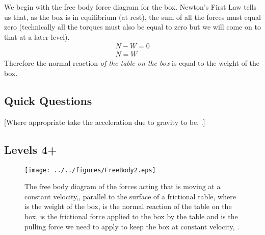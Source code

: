 \noindent We begin with the free body force diagram for the box.  Newton's First Law tells us that, as the box is in equilibrium (at rest), the sum of all the forces must equal zero (technically all the torques must also be equal to zero but we will come on to that at a later level).
\begin{eqnarray}
N-W=0 \\
N=W
\end{eqnarray}
Therefore the normal reaction \emph{of the table on the box} is equal to the weight of the box.

\subsection*{Quick Questions}
[Where appropriate take the acceleration due to gravity to be, .]\nll
{}\nl
{}\nl
{}


\subsection*{Levels 4+}
\setlength{\columnsep}{22pt}
\begin{wrapfigure}{r}{6cm} \vspace{-2.0cm}
\center
\texttt{[image: ../../figures/FreeBody2.eps]}
\caption{The free body diagram of the forces acting  that is moving at a constant velocity,, parallel to the surface of a frictional table, where  is the weight of the box,  is the normal reaction of the table on the box,  is the frictional force applied to the box by the table and  is the pulling force we need to apply to keep the box at constant velocity, . } \label{NI2}
\end{wrapfigure}

